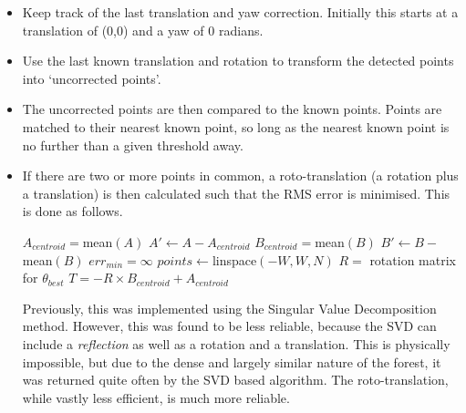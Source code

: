 \documentclass[12pt,oneside,a4paper]{book}
\begin{document}
\begin{itemize}
\item Keep track of the last translation and yaw correction. Initially
  this starts at a translation of (0,0) and a yaw of 0 radians.
\item Use the last known translation and rotation to transform the
  detected points into `uncorrected points'.
\item The uncorrected points are then compared to the known
  points. Points are matched to their nearest known point, so long as
  the nearest known point is no further than a given threshold away.
\item If there are two or more points in common, a roto-translation (a
  rotation plus a translation) is then calculated such that the RMS
  error is minimised. This is done as follows.

  \IncMargin{1em}
  \begin{algorithm}
    \BlankLine
    $A_{centroid} = $mean$(A)$\;
    $A' \leftarrow A - A_{centroid}$\;
    $B_{centroid} = $mean$(B)$\;
    $B' \leftarrow B - $mean$(B)$\;
    \BlankLine
    $err_{min} = \infty$ \;
    $points \leftarrow $linspace$(-W, W, N)$ \;
    \BlankLine
    \BlankLine
    $R = $ rotation matrix for $\theta_{best}$ \;
    $T = -R \times B_{centroid} + A_{centroid}$\;
    \BlankLine
  \end{algorithm}
 
  Previously, this was implemented using the Singular Value
  Decomposition method. However, this was found to be less reliable,
  because the SVD can include a \emph{reflection} as well as a
  rotation and a translation. This is physically impossible, but due
  to the dense and largely similar nature of the forest, it was
  returned quite often by the SVD based algorithm. The
  roto-translation, while vastly less efficient, is much more reliable.



\end{itemize}
\end{document}

